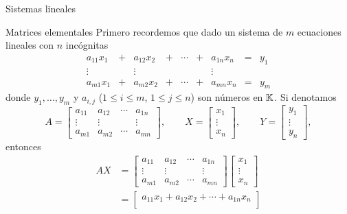 \begin{chapter}{Sistemas lineales}
\begin{section}{Matrices elementales}
            Primero recordemos que dado un sistema de $m$  ecuaciones lineales con $n$ incógnitas
            \begin{equation}\label{sist-eq-gen-3}
            \begin{matrix} 
            a_{11}x_1& + &a_{12}x_2& + &\cdots& + &a_{1n}x_n &= &y_1\\
            \vdots&  &\vdots& &&  &\vdots \\
            a_{m1}x_1& + &a_{m2}x_2& + &\cdots& + &a_{mn}x_n &=&y_m
            \end{matrix}
            \end{equation}
            donde $y_1, \ldots,y_m$ y $a_{i,j}$ ($1 \le i \le m$, $1 \le j \le n$) son números en $\mathbb K$. Si denotamos
            \begin{equation*}
            A = \begin{bmatrix}
            a_{11}& a_{12}& \cdots &a_{1n} \\
            \vdots&\vdots  &  &\vdots \\
            a_{m1} &a_{m2}&\cdots &a_{mn}\end{bmatrix},\qquad
            X = \begin{bmatrix}
            x_1 \\ \vdots \\ x_n 
            \end{bmatrix},
            \qquad 
            Y = \begin{bmatrix}
            y_1 \\ \vdots \\ y_n
            \end{bmatrix},
            \end{equation*}
            entonces 
            \begin{align*}
            AX &= \begin{bmatrix}
            a_{11}& a_{12}& \cdots &a_{1n} \\
            \vdots&\vdots  &  &\vdots \\
            a_{m1} &a_{m2}&\cdots &a_{mn}\end{bmatrix} \begin{bmatrix} 
            x_1 \\ \vdots \\ x_n 
            \end{bmatrix} \\
            &=
            \begin{bmatrix}
            a_{11}x_1+ a_{12}x_2+ \cdots +a_{1n}x_n \\

\end{bmatrix}
\end{align*}
\end{section}
\end{chapter}
